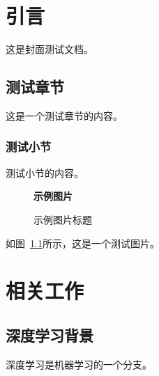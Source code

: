 \documentclass{sduthesis}
\begin{document}
\MakeCover

\chapter{引言}
\label{cha:intro}

这是封面测试文档。

\section{测试章节}
\label{sec:test}

这是一个测试章节的内容。

\subsection{测试小节}

测试小节的内容。

\begin{figure}[htbp]
  \centering
  \textbf{示例图片}
  \caption{示例图片标题}
  \label{fig:example}
\end{figure}

如图~\ref{fig:example}所示，这是一个测试图片。

\chapter{相关工作}
\label{cha:related}

\section{深度学习背景}

深度学习是机器学习的一个分支。


\end{document}
